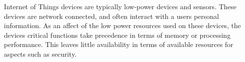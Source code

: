 Internet of Things devices are typically low-power devices and sensors. These
devices are network connected, and often interact with a users personal
information. As an affect of the low power resources used on these devices, the
devices critical functions take precedence in terms of memory or processing
performance. This leaves little availability in terms of available resources for
aspects such as security.



